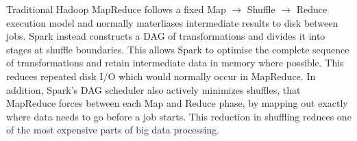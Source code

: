 Traditional Hadoop MapReduce follows a fixed Map $\rightarrow$ Shuffle $\rightarrow$ Reduce execution model and normally materliases intermediate results to disk between jobs. Spark instead constructs a DAG of transformations and divides it into stages at shuffle boundaries. This allows Spark to optimise the complete sequence of transformations and retain intermediate data in memory where possible. This reduces repeated disk I/O which would normally occur in MapReduce. In addition, Spark's DAG scheduler also actively minimizes shuffles, that MapReduce forces between each Map and Reduce phase, by mapping out exactly where data needs to go before a job starts. This reduction in shuffling reduces one of the most expensive parts of big data processing.




 





